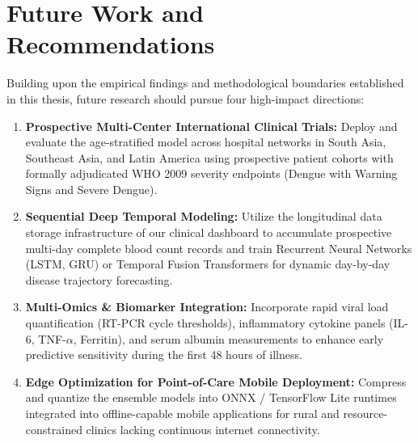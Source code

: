 \documentclass[12pt, a4paper]{report}
\begin{document}
\section{Future Work and Recommendations}
Building upon the empirical findings and methodological boundaries established in this thesis, future research should pursue four high-impact directions:
\begin{enumerate}
    \item \textbf{Prospective Multi-Center International Clinical Trials:} Deploy and evaluate the age-stratified model across hospital networks in South Asia, Southeast Asia, and Latin America using prospective patient cohorts with formally adjudicated WHO 2009 severity endpoints (Dengue with Warning Signs and Severe Dengue).
    \item \textbf{Sequential Deep Temporal Modeling:} Utilize the longitudinal data storage infrastructure of our clinical dashboard to accumulate prospective multi-day complete blood count records and train Recurrent Neural Networks (LSTM, GRU) or Temporal Fusion Transformers for dynamic day-by-day disease trajectory forecasting.
    \item \textbf{Multi-Omics \& Biomarker Integration:} Incorporate rapid viral load quantification (RT-PCR cycle thresholds), inflammatory cytokine panels (IL-6, TNF-$\alpha$, Ferritin), and serum albumin measurements to enhance early predictive sensitivity during the first 48 hours of illness.
    \item \textbf{Edge Optimization for Point-of-Care Mobile Deployment:} Compress and quantize the ensemble models into ONNX / TensorFlow Lite runtimes integrated into offline-capable mobile applications for rural and resource-constrained clinics lacking continuous internet connectivity.
\end{enumerate}
\end{document}
